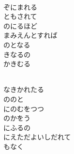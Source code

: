 \documentclass[10pt,b5j]{tarticle} %
\begin{document}
\vspace{1.5em} %
\newcommand{\linespace}{0.5em} %
\newcommand{\blocksize}{0.5\hsize} %
\newcommand{\itemmargin}{3em} %
\begin{enumerate} %
    \setlength{\itemindent}{\itemmargin} %
    \begin{minipage}[c]{\blocksize}
    
        \vspace{\linespace}
        \item~\\
        ぞにまれる\\
        ともされて\\
        のにるほど\\
        まみえんとすれば\\
        のとなる\\
        きなるの\\
        かきむる
        
    \end{minipage}
    \begin{minipage}[c]{\blocksize}
        
        \vspace{\linespace}
        \item~\\
        なきかれたる\\
        ののと\\
        にのむをつつ\\
        のかをう\\
        にふるの\\
        にえただよいしだれて\\
        もなく
        
    \end{minipage}
    \begin{minipage}[c]{\blocksize}
        

\end{minipage}
\end{enumerate}
\end{document}

